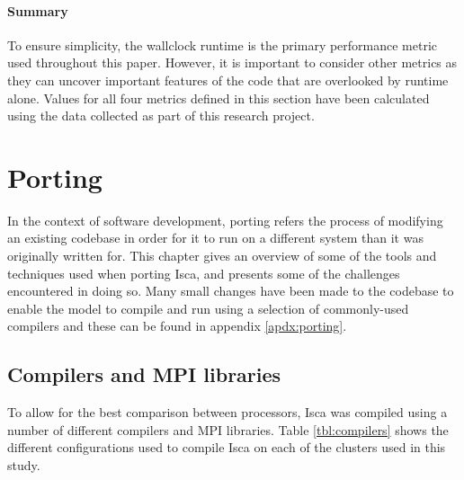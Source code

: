 \documentclass[a4paper,11pt]{report}
\begin{document}
\subsubsection{Summary}
To ensure simplicity, the wallclock runtime is the primary performance metric used throughout this paper. However, it is important to consider other metrics as they can uncover important features of the code that are overlooked by runtime alone. Values for all four metrics defined in this section have been calculated using the data collected as part of this research project. 




\let\textcircled=\pgftextcircled
\chapter{Porting}
\label{chap:baselineexp}
In the context of software development, porting refers the process of modifying an existing codebase in order for it to run on a different system than it was originally written for. This chapter gives an overview of some of the tools and techniques used when porting Isca, and presents some of the challenges encountered in doing so. Many small changes have been made to the codebase to enable the model to compile and run using a selection of commonly-used compilers and these can be found in appendix \ref{apdx:porting}. 

\section{Compilers and MPI libraries}
To allow for the best comparison between processors, Isca was compiled using a number of different compilers and MPI libraries. Table \ref{tbl:compilers} shows the different configurations used to compile Isca on each of the clusters used in this study. 
\end{document}
